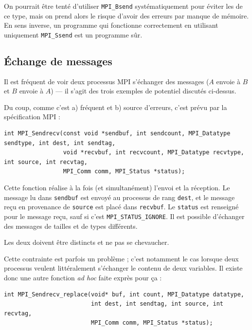 On pourrait être tenté d'utiliser \verb|MPI_Bsend| systématiquement pour éviter
les  de ce type, mais on prend alors le risque d'avoir des
erreurs par manque de mémoire. En sens inverse, un programme qui fonctionne
correctement en utilisant uniquement \verb|MPI_Ssend| est un programme \og
sûr\fg.

\subsection{Échange de messages}

Il est fréquent de voir deux processus MPI s'échanger des messages ($A$ envoie à
$B$ et $B$ envoie à $A$) --- il s'agit des trois exemples de 
potentiel discutés ci-dessus.

Du coup, comme c'est a) fréquent et b) source d'erreurs, c'est prévu par la spécification MPI :

\begin{verbatim}
int MPI_Sendrecv(const void *sendbuf, int sendcount, MPI_Datatype sendtype, int dest, int sendtag, 
                 void *recvbuf, int recvcount, MPI_Datatype recvtype, int source, int recvtag, 
                 MPI_Comm comm, MPI_Status *status);
\end{verbatim}

Cette fonction réalise à la fois (et simultanément) l'envoi et la réception. Le
message lu dans \verb|sendbuf| est envoyé au processus de rang \verb|dest|, et
le message reçu en provenance de \verb|source| est placé dans \verb|recvbuf|. Le
\verb|status| est renseigné pour le message reçu, sauf si c'est
\verb|MPI_STATUS_IGNORE|. Il est possible d'échanger des messages de tailles et
de types différents.

\begin{danger}
  Les deux  doivent être distincts et ne pas se chevaucher.
\end{danger}

Cette contrainte est parfois un problème ; c'est notamment le cas lorsque deux
processus veulent littéralement s'échanger le contenu de deux variables. Il
existe donc une autre fonction \textit{ad hoc} faite exprès pour ça :

\begin{verbatim}
int MPI_Sendrecv_replace(void* buf, int count, MPI_Datatype datatype,
                         int dest, int sendtag, int source, int recvtag, 
                         MPI_Comm comm, MPI_Status *status);
\end{verbatim}

